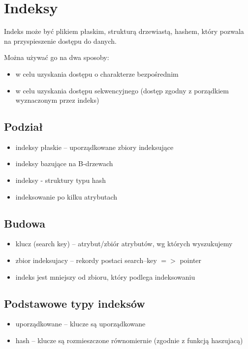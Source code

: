 \documentclass[12pt]{article}
\begin{document}
\section{Indeksy}
Indeks może być plikiem płaskim, strukturą drzewiastą, hashem, który pozwala na
przyspieszenie dostępu do danych.

Można używać go na dwa sposoby:
\begin{itemize}
\item w celu uzyskania dostępu o charakterze bezpośrednim
\item w celu uzyskania dostępu sekwencyjnego (dostęp zgodny z porządkiem wyznaczonym przez indeks)
\end{itemize}

\subsection{Podział}
\begin{itemize}
\item indeksy płaskie -- uporządkowane zbiory indeksujące
\item indeksy bazujące na B-drzewach
\item indeksy - struktury typu hash
\item indeksowanie po kilku atrybutach
\end{itemize}

\subsection{Budowa}
\begin{itemize}
\item klucz (search key) -- atrybut/zbiór atrybutów, wg których wyszukujemy
\item zbior indeksujacy -- rekordy postaci search--key $=>$ pointer
\item indeks jest mniejszy od zbioru, który podlega indeksowaniu
\end{itemize}

\subsection{Podstawowe typy indeksów}
\begin{itemize}
\item uporządkowane -- klucze są uporządkowane
\item hash -- klucze są rozmieszczone równomiernie (zgodnie z funkcją haszujacą)
\end{itemize}
\end{document}
